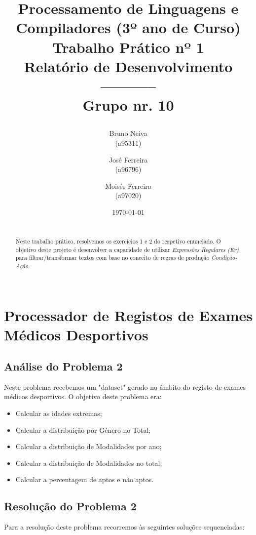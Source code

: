 \documentclass[11pt,a4paper]{report}%
\title{Processamento de Linguagens e Compiladores (3º ano de Curso)\\
       \textbf{Trabalho Prático nº 1
}\\ Relatório de Desenvolvimento\\-----------
\\Grupo nr. 10

       } %
\author{Bruno Neiva\\ (a95311) \and José Ferreira\\ (a96796) \and Moisés Ferreira\\ (a97020)
       } %
\date{\today} %
\begin{document}
\maketitle %

\begin{abstract}  %
\\Neste trabalho prático, resolvemos os exercícios 1 e 2 do respetivo enunciado. O objetivo deste projeto é desenvolver a capacidade de utilizar \textit{Expressões Regulares (Er)} para filtrar/transformar textos com base no conceito de regras de produção \textit{Condição-Ação}.\\\
\end{abstract}

\tableofcontents %

\newpage
\chapter{ Processador de Registos de Exames Médicos Desportivos} \label{chap:ex2} %


\section{Análise do Problema 2} \label{sec:analiseProb2}
Neste problema recebemos um "dataset" gerado no âmbito do registo de exames médicos desportivos.
O objetivo deste problema era:

\begin{itemize}
  \item Calcular as idades extremas;
  \item Calcular a distribuição por Género no Total;
  \item Calcular a distribuição de Modalidades por ano;
  \item Calcular a distribuição de Modalidades no total;
  \item Calcular a percentagem de aptos e não aptos.
\end{itemize}

\newpage
\section{Resolução do Problema 2} \label{sec:resProb2}

Para a resolução deste problema recorremos às seguintes soluções sequenciadas:
\end{document}
